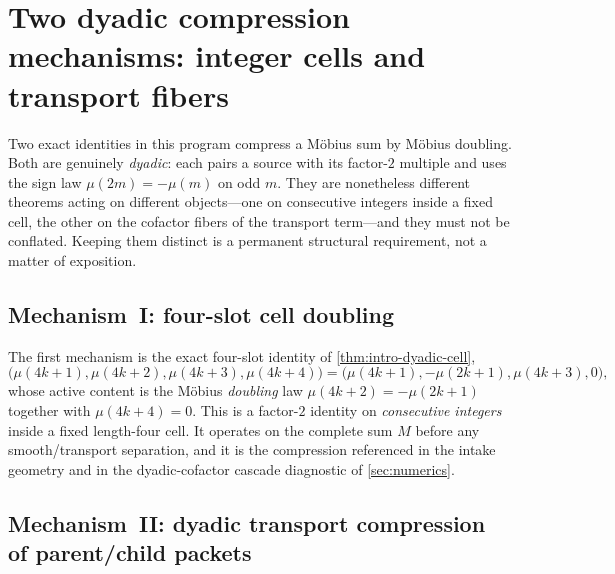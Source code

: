 \section{Two dyadic compression mechanisms: integer cells and transport fibers}
\label{sec:two-compressions}

Two exact identities in this program compress a M\"obius sum by M\"obius doubling.  Both are genuinely \emph{dyadic}: each pairs a source with its factor-$2$ multiple and uses the sign law $\mu(2m)=-\mu(m)$ on odd $m$.  They are nonetheless different theorems acting on different objects---one on consecutive integers inside a fixed cell, the other on the cofactor fibers of the transport term---and they must not be conflated.  Keeping them distinct is a permanent structural requirement, not a matter of exposition.

\subsection{Mechanism~I: four-slot cell doubling}

The first mechanism is the exact four-slot identity of \cref{thm:intro-dyadic-cell},
\[
 \bigl(\mu(4k+1),\mu(4k+2),\mu(4k+3),\mu(4k+4)\bigr)
 =\bigl(\mu(4k+1),-\mu(2k+1),\mu(4k+3),0\bigr),
\]
whose active content is the M\"obius \emph{doubling} law $\mu(4k+2)=-\mu(2k+1)$ together with $\mu(4k+4)=0$.  This is a factor-$2$ identity on \emph{consecutive integers} inside a fixed length-four cell.  It operates on the complete sum $M$ before any smooth/transport separation, and it is the compression referenced in the intake geometry and in the dyadic-cofactor cascade diagnostic of \cref{sec:numerics}.

\subsection{Mechanism~II: dyadic transport compression of parent/child packets}

